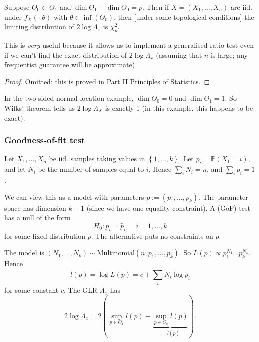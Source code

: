 \documentclass[egregdoesnotlikesansseriftitles,a4paper]{scrartcl}
\begin{document}
\begin{theorem}
     Suppose $\Theta_0 \subset \Theta_1 $ and $\operatorname{dim}\Theta_1 -\operatorname{dim}\Theta_0 =p$. Then if $X=(X_1 , \ldots, X_n)$ are iid. under $f_{X}(\cdot | \theta)$ with $\theta \in \inf (\Theta_0 )$, then [under some topological conditions] the limiting distribution of $2\log \Lambda_{x}$ is $\chi_{p}^2$.
     \begin{remark}
           This is \emph{very} useful because it allows us to implement a generalised ratio test even if we can't find the exact distribution of $2 \log \Lambda_{x}$ (assuming that $n$ is large; any frequentist guarantee will be approximate).
     \end{remark}
     \begin{proof}
           Omitted; this is proved in Part II Principles of Statistics.
     \end{proof}
\end{theorem}
\begin{example*}
      In the two-sided normal location example, $\operatorname{dim}\Theta_0 =0$ and $\operatorname{dim} \Theta_1 =1$. So Wilks' theorem tells us $2 \log \Lambda_{X}$ is exactly 1 (in this example, this happens to be exact). 
\end{example*}
\subsubsection*{Goodness-of-fit test}
Let $X_1 ,\ldots,X_n$ be iid. samples taking values in $\left\{1, \ldots, k\right\}$. Let $p_{i}=\mathbb{P}(X_1 =i)$, and let $N_{i}$ be the number of samples equal to $i$. Hence $\sum_{i}^{}N_{i}=n$, and $\sum_{i}^{}p_{i}=1$. 

We can view this as a model with parameters $p:= (p_1 , \ldots,p_{k})$. The parameter space has dimension $k-1$ (since we have one equality constraint). A  (GoF) test has a null of the form \[
H_0 : p_{i}=\widetilde{p_{i}}, \quad i=1, \ldots, k
\] for some fixed distribution $\widetilde{p}$. The alternative puts no constraints on $p$.

The model is $(N_1 , \ldots, N_k) \sim \text{Multinomial}(n; p_1 , \ldots, p_{k})$. So $L (p) \propto p_1^{N_1 } \ldots p_{k}^{N_{k}}$. Hence \[
l (p)=\log L (p)= c+ \sum_{i}^{}N_{i} \log p_{i}
\] for some constant $c$. The GLR $\Lambda_{x}$ has \[
2 \log \Lambda_{x}=2 (\sup_{p \in \Theta_1 }l (p)-\underbrace{\sup_{p \in \Theta_0}l (p)}_{=l(\widetilde{p})} )
.\]
\end{document}
